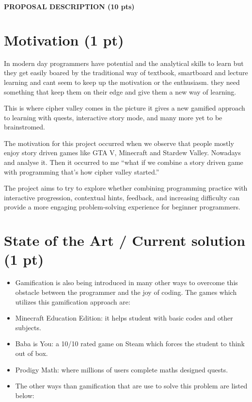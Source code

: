 \documentclass[12pt,a4paper]{article}
\begin{document}
\newpage
\begin{center}
{\large\bfseries PROPOSAL DESCRIPTION (10 pts)\par}
\end{center}

\section*{Motivation (1 pt)}
In modern day programmers have potential and the analytical skills to learn but they get easily boared by the traditional way of textbook, smartboard and lecture learning and cant seem to keep up the motivation or the enthusiasm. they need something that keep them on their edge and give them a new way of learning.

This is where cipher valley comes in the picture it gives a new gamified approach to learning with quests, interactive story mode, and many more yet to be brainstromed.

The motivation for this project occurred when we observe that people mostly enjoy story driven games like GTA V, Minecraft and Stardew Valley. Nowadays and analyse it. Then it occurred to me ``what if we combine a story driven game with programming that's how cipher valley started.''

The project aims to try to explore whether combining programming practice with interactive progression, contextual hints, feedback, and increasing difficulty can provide a more engaging problem-solving experience for beginner programmers.

\section*{State of the Art / Current solution (1 pt)}
\begin{itemize}
\item Gamification is also being introduced in many other ways to overcome this obstacle between the programmer and the joy of coding. The games which utilizes this gamification approach are:
\item Minecraft Education Edition: it helps student with basic codes and other subjects.
\item Baba is You: a 10/10 rated game on Steam which forces the student to think out of box.
\item Prodigy Math: where millions of users complete maths designed quests.
\item The other ways than gamification that are use to solve this problem are listed below:
\end{itemize}
\end{document}

